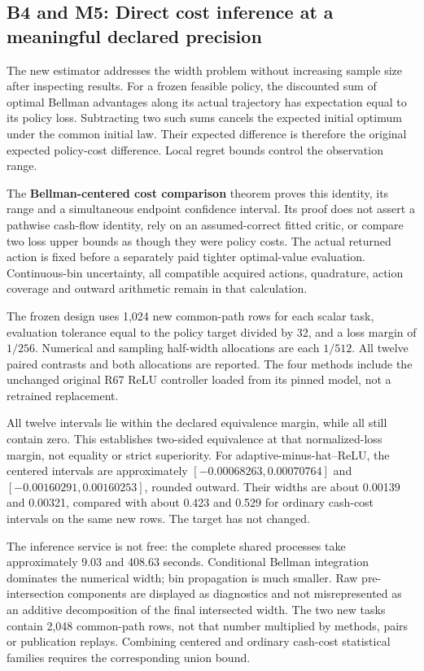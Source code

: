 \documentclass[ecta,nameyear,draft]{econsocart}
\begin{document}
\hypertarget{b4-and-m5-direct-cost-inference-at-a-meaningful-declared-precision}{%
\subsection{B4 and M5: Direct cost inference at a meaningful declared
precision}\label{b4-and-m5-direct-cost-inference-at-a-meaningful-declared-precision}}

The new estimator addresses the width problem without increasing sample
size after inspecting results. For a frozen feasible policy, the
discounted sum of optimal Bellman advantages along its actual trajectory
has expectation equal to its policy loss. Subtracting two such sums
cancels the expected initial optimum under the common initial law. Their
expected difference is therefore the original expected policy-cost
difference. Local regret bounds control the observation range.

The \textbf{Bellman-centered cost comparison} theorem proves this
identity, its range and a simultaneous endpoint confidence interval. Its
proof does not assert a pathwise cash-flow identity, rely on an
assumed-correct fitted critic, or compare two loss upper bounds as
though they were policy costs. The actual returned action is fixed
before a separately paid tighter optimal-value evaluation.
Continuous-bin uncertainty, all compatible acquired actions, quadrature,
action coverage and outward arithmetic remain in that calculation.

The frozen design uses 1,024 new common-path rows for each scalar task,
evaluation tolerance equal to the policy target divided by 32, and a
loss margin of \(1/256\). Numerical and sampling half-width allocations
are each \(1/512\). All twelve paired contrasts and both allocations are
reported. The four methods include the unchanged original R67 ReLU
controller loaded from its pinned model, not a retrained replacement.

All twelve intervals lie within the declared equivalence margin, while
all still contain zero. This establishes two-sided equivalence at that
normalized-loss margin, not equality or strict superiority. For
adaptive-minus-hat--ReLU, the centered intervals are approximately
\([-0.00068263,0.00070764]\) and \([-0.00160291,0.00160253]\), rounded
outward. Their widths are about 0.00139 and 0.00321, compared with about
0.423 and 0.529 for ordinary cash-cost intervals on the same new rows.
The target has not changed.

The inference service is not free: the complete shared processes take
approximately 9.03 and 408.63 seconds. Conditional Bellman integration
dominates the numerical width; bin propagation is much smaller. Raw
pre-intersection components are displayed as diagnostics and not
misrepresented as an additive decomposition of the final intersected
width. The two new tasks contain 2,048 common-path rows, not that number
multiplied by methods, pairs or publication replays. Combining centered
and ordinary cash-cost statistical families requires the corresponding
union bound.
\end{document}
